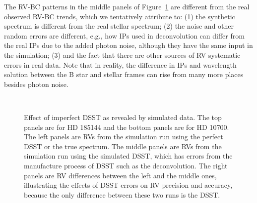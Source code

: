 The RV-BC patterns in the middle panels of Figure~\ref{keck:fig:dsst}
are different from the real observed RV-BC trends, which we
tentatively attribute to: (1) the synthetic spectrum is different from
the real stellar spectrum; (2) the noise and other random errors are
different, e.g., how IPs used in deconvolution can differ from the
real IPs due to the added photon noise, although they have the same
input in the simulation; (3) and the fact that there are other sources
of RV systematic errors in real data. Note that in reality, the
difference in IPs and wavelength solution between the B star and
stellar frames can rise from many more places besides photon noise.


\begin{figure}
\
\
\caption{Effect of imperfect DSST as revealed by simulated data. The top
  panels are for HD 185144 and the bottom panels are for HD 10700. The
  left panels are RVs from the simulation run using the perfect DSST
  or the true spectrum. The middle panels are RVs from the simulation
  run using the simulated DSST, which has errors from the manufacture
  process of DSST such as the deconvolution. The right panels are RV
  differences between the left and the middle ones, illustrating the
  effects of DSST errors on RV precision and accuracy, because the
  only difference between these two runs is the DSST.
\label{keck:fig:dsst}}
\end{figure}


